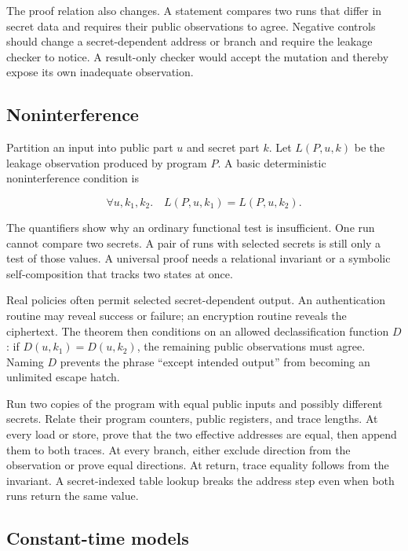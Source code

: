 The proof relation also changes. A  statement compares
two runs that differ in secret data and
requires their public observations to agree. Negative controls should change a
secret-dependent address or branch and require the leakage checker to notice.
A result-only checker would accept the mutation and thereby expose its own
inadequate observation.

\subsection{Noninterference}

Partition an input into public part \(u\) and secret part \(k\). Let
\(L(P,u,k)\) be the leakage observation produced by program \(P\). A basic
deterministic noninterference condition is

\[
  \forall u,k_1,k_2.\quad
  L(P,u,k_1)=L(P,u,k_2).
\]

The quantifiers show why an ordinary functional test is insufficient. One run
cannot compare two secrets. A pair of runs with selected secrets is still only
a test of those values. A universal proof needs a relational invariant or a
symbolic self-composition that tracks two states at once.

Real policies often permit selected secret-dependent output. An authentication
routine may reveal success or failure; an encryption routine reveals the
ciphertext. The theorem then conditions on an allowed declassification
function \(D\): if \(D(u,k_1)=D(u,k_2)\), the remaining public observations
must agree. Naming \(D\) prevents the phrase ``except intended output'' from
becoming an unlimited escape hatch.

\begin{proofkit}[title={A relational invariant for an address-trace policy}]
Run two copies of the program with equal public inputs and possibly different
secrets. Relate their program counters, public registers, and trace lengths.
At every load or store, prove that the two effective addresses are equal, then
append them to both traces. At every branch, either exclude direction from the
observation or prove equal directions. At return, trace equality follows from
the invariant. A secret-indexed table lookup breaks the address step even when
both runs return the same value.
\end{proofkit}

\subsection{Constant-time models}


